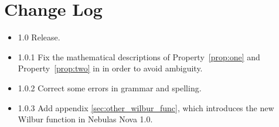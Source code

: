 \section{Change Log}
\begin{itemize}
\item{1.0} Release.
\item{1.0.1} Fix the mathematical descriptions of Property~\ref{prop:one} and Property~\ref{prop:two} in  in order to avoid ambiguity.
\item{1.0.2} Correct some errors in grammar and spelling.
\item{1.0.3} Add appendix \ref{sec:other_wilbur_func}, which introduces the new Wilbur function in Nebulas Nova 1.0.
\end{itemize}
